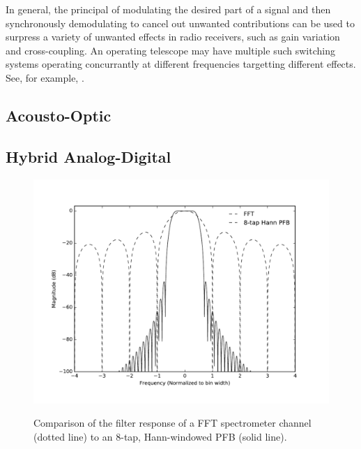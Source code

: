 \documentclass{ws-rv961x669}
\begin{document}
In general, the principal of modulating the desired part of a signal and then synchronously demodulating to cancel out unwanted contributions can be used to surpress a variety of unwanted effects in radio receivers, such as gain variation and cross-coupling. An operating telescope may have multiple such switching systems operating concurrantly at different frequencies targetting different effects. See, for example, \cite{Erickson2007}. 

\subsection{Acousto-Optic}\label{acousto-optic}

\subsection{Hybrid Analog-Digital}\label{hybrid-analog-digital}


\begin{figure}
 \centering
 \includegraphics[width=\textwidth]{./figures/pfb_resp}
 \label{fig:pfb_response}
 \caption{Comparison of the filter response of a FFT spectrometer channel (dotted line) to an 8-tap, Hann-windowed PFB (solid line).}
\end{figure}
\end{document}
